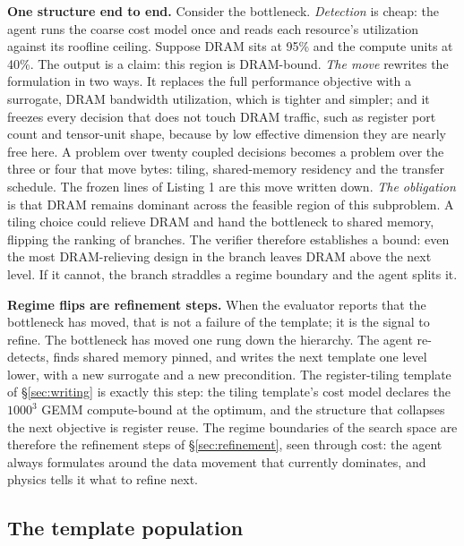 \documentclass[11pt]{article}
\begin{document}
\textbf{One structure end to end.} Consider the bottleneck. \emph{Detection} is cheap: the agent runs the coarse cost model once and reads each resource's utilization against its roofline ceiling. Suppose DRAM sits at 95\% and the compute units at 40\%. The output is a claim: this region is DRAM-bound. \emph{The move} rewrites the formulation in two ways. It replaces the full performance objective with a surrogate, DRAM bandwidth utilization, which is tighter and simpler; and it freezes every decision that does not touch DRAM traffic, such as register port count and tensor-unit shape, because by low effective dimension they are nearly free here. A problem over twenty coupled decisions becomes a problem over the three or four that move bytes: tiling, shared-memory residency and the transfer schedule. The frozen lines of Listing 1 are this move written down. \emph{The obligation} is that DRAM remains dominant across the feasible region of this subproblem. A tiling choice could relieve DRAM and hand the bottleneck to shared memory, flipping the ranking of branches. The verifier therefore establishes a bound: even the most DRAM-relieving design in the branch leaves DRAM above the next level. If it cannot, the branch straddles a regime boundary and the agent splits it.

\textbf{Regime flips are refinement steps.} When the evaluator reports that the bottleneck has moved, that is not a failure of the template; it is the signal to refine. The bottleneck has moved one rung down the hierarchy. The agent re-detects, finds shared memory pinned, and writes the next template one level lower, with a new surrogate and a new precondition. The register-tiling template of §\ref{sec:writing} is exactly this step: the tiling template's cost model declares the \(1000^3\) GEMM compute-bound at the optimum, and the structure that collapses the next objective is register reuse. The regime boundaries of the search space are therefore the refinement steps of §\ref{sec:refinement}, seen through cost: the agent always formulates around the data movement that currently dominates, and physics tells it what to refine next.

\subsection{The template population}\label{sec:population}
\end{document}
